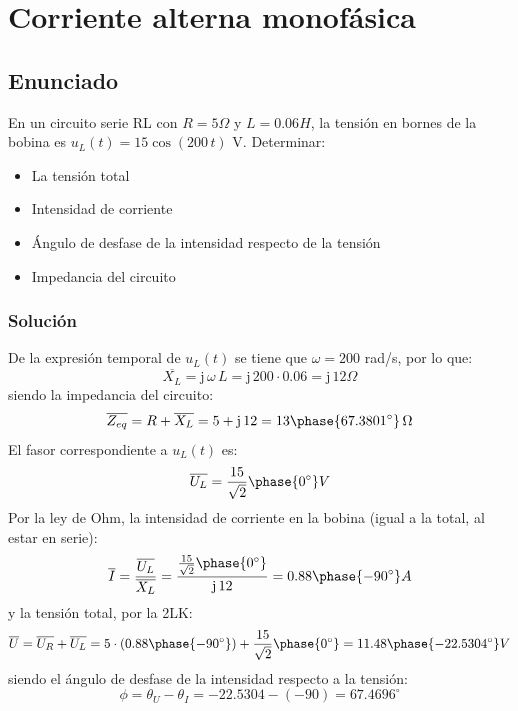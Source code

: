 \chapter{Corriente alterna monofásica}

\section{Enunciado}
En un circuito serie RL con $R=5\Omega$ y $L=0.06H$, la tensión en
bornes de la bobina es $u_L(t)=15\cos(200\,t)$ V. Determinar:
\begin{itemize}
\item La tensión total
\item Intensidad de corriente
\item Ángulo de desfase de la intensidad respecto de la tensión
\item Impedancia del circuito
\end{itemize}

\subsection*{Solución}

De la expresión temporal de $u_L(t)$ se tiene que $\omega=200$ rad/s,
por lo que:
\begin{equation*}
  \overline{X_L}=\mathrm{j}\,\omega\,L=\mathrm{j}\,200\cdot0.06=\mathrm{j}\,12\Omega
\end{equation*}
siendo la impedancia del circuito:
\begin{equation*}
  \overline{Z_{eq}}=R+\overline{X_L}=5+\mathrm{j}\,12=13\phase{67.3801^\circ}\,\Omega
\end{equation*}
El fasor correspondiente a $u_L(t)$ es:
\begin{equation*}
  \overline{U_L}=\dfrac{15}{\sqrt{2}}\phase{0^\circ}V
\end{equation*}
Por la ley de Ohm, la intensidad de corriente en la bobina (igual a la
total, al estar en serie):
\begin{equation*}
  \overline{I}=\dfrac{\overline{U_L}}{\overline{X_L}}=\dfrac{\frac{15}{\sqrt{2}}\phase{0^\circ}}{\mathrm{j}\,12}=0.88\phase{-90^\circ}A
\end{equation*}
y la tensión total, por la 2LK:
\begin{equation*}
  \overline{U}=\overline{U_R}+\overline{U_L}=5\cdot (0.88\phase{-90^\circ})+\dfrac{15}{\sqrt{2}}\phase{0^\circ}=11.48\phase{-22.5304^\circ} V
\end{equation*}
siendo el ángulo de desfase de la intensidad respecto a la tensión:
\begin{equation*}
  \phi=\theta_U-\theta_I=-22.5304-(-90)=67.4696^\circ
\end{equation*}

